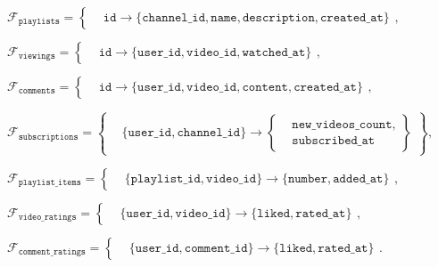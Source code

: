 $
\mathcal{F}_{\texttt{playlists}} =
\left\{
    \begin{aligned}
        & \texttt{id} \to \{\texttt{channel\_id}, \texttt{name}, \texttt{description}, \texttt{created\_at}\}
    \end{aligned}
\right.,
$

$
\mathcal{F}_{\texttt{viewings}} =
\left\{
    \begin{aligned}
        & \texttt{id} \to \{\texttt{user\_id}, \texttt{video\_id}, \texttt{watched\_at}\}
    \end{aligned}
\right.,
$

$
\mathcal{F}_{\texttt{comments}} =
\left\{
    \begin{aligned}
        & \texttt{id} \to \{\texttt{user\_id}, \texttt{video\_id}, \texttt{content}, \texttt{created\_at}\}
    \end{aligned}
\right.,
$

$
\mathcal{F}_{\texttt{subscriptions}} =
\left\{
    \begin{aligned}
        & \{\texttt{user\_id}, \texttt{channel\_id}\} \to \left\{
                                                              \begin{aligned}
                                                                  & \texttt{new\_videos\_count}, \\
                                                                  & \texttt{subscribed\_at}
                                                              \end{aligned}
        \right\}
    \end{aligned}
\right\},
$

$
\mathcal{F}_{\texttt{playlist\_items}} =
\left\{
    \begin{aligned}
        & \{\texttt{playlist\_id}, \texttt{video\_id}\} \to \{\texttt{number}, \texttt{added\_at}\}
    \end{aligned}
\right.,
$

$
\mathcal{F}_{\texttt{video\_ratings}} =
\left\{
    \begin{aligned}
        & \{\texttt{user\_id}, \texttt{video\_id}\} \to \{\texttt{liked}, \texttt{rated\_at}\}
    \end{aligned}
\right.,
$

$
\mathcal{F}_{\texttt{comment\_ratings}} =
\left\{
    \begin{aligned}
        & \{\texttt{user\_id}, \texttt{comment\_id}\} \to \{\texttt{liked}, \texttt{rated\_at}\}
    \end{aligned}
\right..
$

